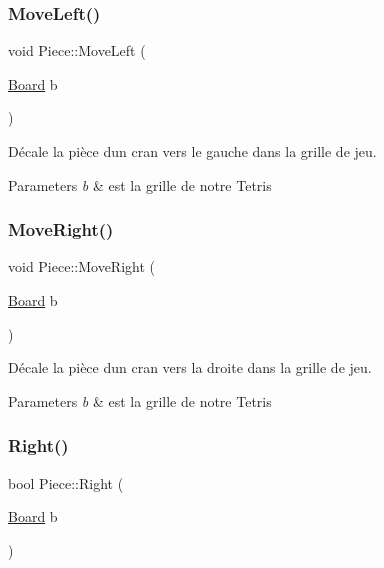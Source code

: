 \subsubsection{\texorpdfstring{Move\+Left()}{MoveLeft()}}
{\footnotesize\ttfamily void Piece\+::\+Move\+Left (\begin{DoxyParamCaption}\item[{\hyperlink{classBoard}{Board}}]{b }\end{DoxyParamCaption})}



Décale la pièce d\textquotesingle{}un cran vers le gauche dans la grille de jeu. 


\begin{DoxyParams}{Parameters}
{\em b} & est la grille de notre Tetris \\
\hline
\end{DoxyParams}
\mbox{\label{classPiece_a938328bd15662dbf8d4bd66145e20e1a}} 
\subsubsection{\texorpdfstring{Move\+Right()}{MoveRight()}}
{\footnotesize\ttfamily void Piece\+::\+Move\+Right (\begin{DoxyParamCaption}\item[{\hyperlink{classBoard}{Board}}]{b }\end{DoxyParamCaption})}



Décale la pièce d\textquotesingle{}un cran vers la droite dans la grille de jeu. 


\begin{DoxyParams}{Parameters}
{\em b} & est la grille de notre Tetris \\
\hline
\end{DoxyParams}
\mbox{\label{classPiece_a44d684a99ea99db740b5bfa73f37ab15}} 
\subsubsection{\texorpdfstring{Right()}{Right()}}
{\footnotesize\ttfamily bool Piece\+::\+Right (\begin{DoxyParamCaption}\item[{\hyperlink{classBoard}{Board}}]{b }\end{DoxyParamCaption})}



